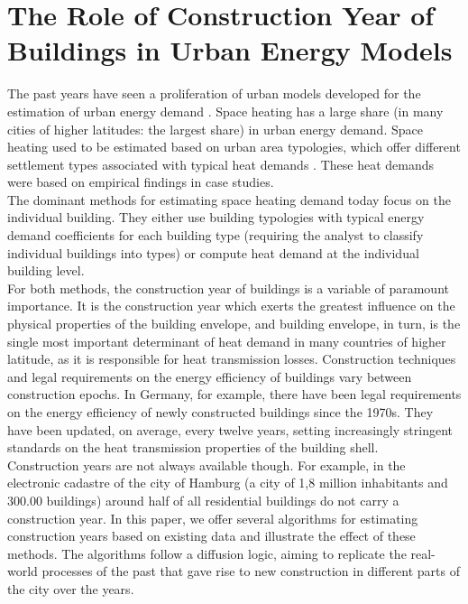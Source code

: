 \section{The Role of Construction Year of Buildings in Urban Energy Models}
 
The past years have seen a proliferation of urban models developed for the
estimation of urban energy demand
\cite{Calderon.2015,Mata.2014,MunozH.2014.IBPSA-JP,MunozH.2014.IJM,Chingcuanco.2012,Fracastoro.2011}.
Space heating has a large share (in many cities of higher latitudes: the
largest share) in urban energy demand. Space heating used to be estimated based
on urban area typologies, which offer different settlement types associated
with typical heat demands 
\cite{Roth.1980,Roth.1981,Blesl.2002,Everding.2004,Blesl.2007,Genske.2009,Erhorn.2011}.
These heat demands were based on empirical findings in case studies.\\
 
The dominant methods for estimating space heating demand today focus on the
individual building. They either use building typologies with typical energy
demand coefficients for each building type (requiring the analyst to classify
individual buildings into types) or compute heat demand at the individual
building level.\\
 
For both methods, the construction year of buildings is a variable of paramount
importance. It is the construction year which exerts the greatest influence on
the physical properties of the building envelope, and building envelope, in
turn, is the single most important determinant of heat demand in many countries
of higher latitude, as it is responsible for heat transmission losses.
Construction techniques and legal requirements on the energy efficiency of
buildings vary between construction epochs. In Germany, for example, there have
been legal requirements on the energy efficiency of newly constructed buildings
since the 1970s. They have been updated, on average, every twelve years,
setting increasingly stringent standards on the heat transmission properties of
the building shell.\\
 
Construction years are not always available though. For example, in the
electronic cadastre of the city of Hamburg (a city of 1,8 million inhabitants
and 300.00 buildings) around half of all residential buildings do not carry a
construction year. In this paper, we offer several algorithms for estimating
construction years based on existing data and illustrate the effect of these
methods. The algorithms follow a diffusion logic, aiming to replicate the
real-world processes of the past that gave rise to new construction in
different parts of the city over the years.\\

